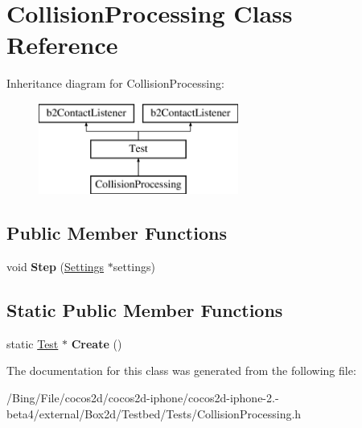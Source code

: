 \hypertarget{class_collision_processing}{\section{Collision\-Processing Class Reference}
\label{class_collision_processing}
}
Inheritance diagram for Collision\-Processing\-:\begin{figure}[H]
\begin{center}
\leavevmode
\includegraphics[height=3.000000cm]{class_collision_processing}
\end{center}
\end{figure}
\subsection*{Public Member Functions}
\begin{DoxyCompactItemize}
\item 
\hypertarget{class_collision_processing_a797535c33b532b0018bbb293e5e601ad}{void {\bfseries Step} (\hyperlink{struct_settings}{Settings} $\ast$settings)}\label{class_collision_processing_a797535c33b532b0018bbb293e5e601ad}

\end{DoxyCompactItemize}
\subsection*{Static Public Member Functions}
\begin{DoxyCompactItemize}
\item 
\hypertarget{class_collision_processing_a6f4c1d7b1baa41e7161b66de57fe2f6a}{static \hyperlink{class_test}{Test} $\ast$ {\bfseries Create} ()}\label{class_collision_processing_a6f4c1d7b1baa41e7161b66de57fe2f6a}

\end{DoxyCompactItemize}


The documentation for this class was generated from the following file\-:\begin{DoxyCompactItemize}
\item 
/\-Bing/\-File/cocos2d/cocos2d-\/iphone/cocos2d-\/iphone-\/2.-\/beta4/external/\-Box2d/\-Testbed/\-Tests/Collision\-Processing.\-h\end{DoxyCompactItemize}
